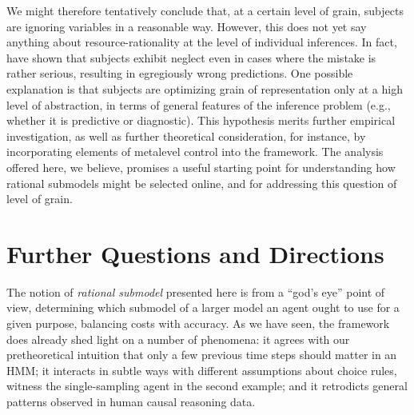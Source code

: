\documentclass[10pt,letterpaper]{article}
\begin{document}

We might therefore tentatively conclude that, at a certain level of grain, subjects are ignoring variables in a reasonable way. 
However, this does not yet say anything about resource-rationality at the level of individual inferences. In fact, \cite{Fernbach2013} have shown that subjects exhibit neglect even in cases where the mistake is rather serious, resulting in egregiously wrong predictions. One possible explanation is that subjects are optimizing grain of representation only at a high level of abstraction, in terms of general features of the inference problem (e.g., whether it is predictive or diagnostic). This hypothesis merits further empirical investigation, as well as further theoretical consideration, for instance, by incorporating elements of metalevel control \citep{Icard2014,Lieder2014} into the framework. The analysis offered here, we believe, promises a useful starting point for understanding how rational submodels might be selected online, and for addressing this question of level of grain.

\section{Further Questions and Directions}

The notion of \emph{rational submodel} presented here is from a ``god's eye'' point of view, determining which submodel of a larger model an agent ought to use for a given purpose, balancing costs with accuracy. As we have seen, the framework does already shed light on a number of phenomena: it agrees with our pretheoretical intuition that only a few previous time steps should matter in an HMM; it interacts in subtle ways with different assumptions about choice rules, witness the single-sampling agent in the second example; and it retrodicts general patterns observed in human causal reasoning data.
\end{document}
